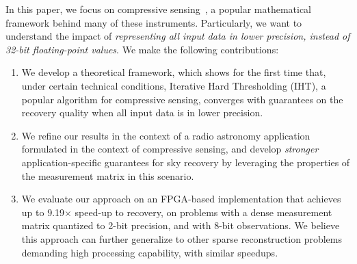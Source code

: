 \documentclass[aoas,preprint]{imsart}
\numberwithin{equation}{section}
\theoremstyle{plain}
\begin{document}
\vspace{0.5em}
In this paper, we focus on compressive sensing~\cite{donoho2006cs, candes2006cs, candes2006cs2}, a popular mathematical framework behind many of these instruments. Particularly, we want to understand 
the impact of {\em representing all input data
in lower precision, instead of 32-bit floating-point values}. 
We make the following contributions:
\vspace{0.5em}

\begin{enumerate}
\item We develop a theoretical framework, which shows for the first time that, under certain
technical conditions, Iterative Hard Thresholding (IHT),
a popular algorithm for compressive sensing, converges
with guarantees on the recovery quality when all 
input data is in lower precision.
\item We refine our results in the context of a radio
astronomy application formulated in
the context of compressive sensing, 
and develop {\em stronger} application-specific 
guarantees for sky recovery by leveraging the properties of the measurement matrix in this scenario.
 
\item We evaluate our approach on an FPGA-based
implementation that achieves up to 9.19$\times$ speed-up to recovery,  
on problems with a dense measurement matrix quantized to 2-bit precision, and with 8-bit observations.
We believe this approach can further generalize to other sparse reconstruction problems demanding high processing capability, with  similar
speedups.
\end{enumerate}
\end{document}
